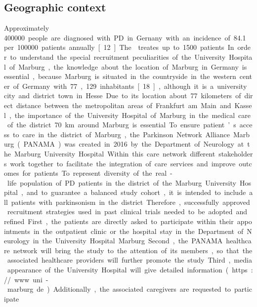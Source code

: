 \subsection{Geographic context}
Approximately \SI{400000} people are diagnosed with \ac{PD} in Gernany with an incidence of \SI{84.1} per \SI{100000} patients annually [12]. The \UKGM treates up to 1500 patients. In order to understand the special recruitment peculiarities of the University Hospital of Marburg, the knowledge about the location of Marburg in Germany is essential, because Marburg is situated in the countryside in the western center of Germany with 77,129 inhabitants [18], although it is a university city and district town in Hesse. Due to its location about 77 kilometers of direct distance between the metropolitan areas of Frankfurt am Main and Kassel, the importance of the University Hospital of Marburg in the medical care of the district 70 km around Marburg is essential. To ensure patient’s access to care in the district of Marburg, the Parkinson Network Alliance Marburg (PANAMA) was created in 2016 by the Department of Neurology at the Marburg University Hospital. Within this care network different stakeholders work together to facilitate the integration of care services and improve outcomes for patients. 

To represent diversity of the real-life population of PD patients in the district of the Marburg University Hospital, and to guarantee a balanced study cohort, it is intended to include all patients with parkinsonism in the district. Therefore, successfully approved recruitment strategies used in past clinical trials needed to be adopted and refined. First, the patients are directly asked to participate within their appointments in the outpatient clinic or the hospital stay in the Department of Neurology in the University Hospital Marburg. Second, the PANAMA healthcare network will bring the study to the attention of its members, so that the associated healthcare providers will further promote the study. Third, media appearance of the University Hospital will give detailed information (https://www.uni-marburg.de). Additionally, the associated caregivers are requested to participate. 

\newpage
